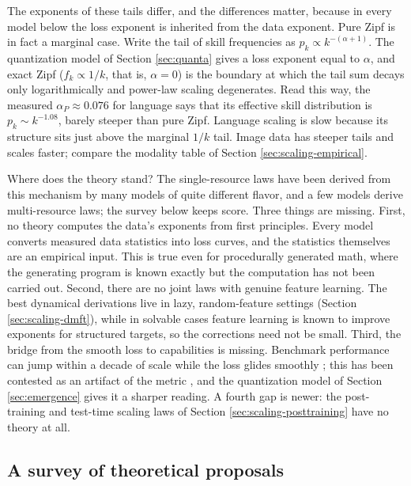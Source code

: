 \documentclass[11pt]{article}
\begin{document}
The exponents of these tails differ, and the differences matter, because in every model below the loss exponent is inherited from the data exponent. Pure Zipf is in fact a marginal case. Write the tail of skill frequencies as $p_k\propto k^{-(\alpha+1)}$. The quantization model of Section \ref{sec:quanta} gives a loss exponent equal to $\alpha$, and exact Zipf ($f_k\propto 1/k$, that is, $\alpha = 0$) is the boundary at which the tail sum decays only logarithmically and power-law scaling degenerates. Read this way, the measured $\alpha_P\approx 0.076$ for language says that its effective skill distribution is $p_k\sim k^{-1.08}$, barely steeper than pure Zipf. Language scaling is slow because its structure sits just above the marginal $1/k$ tail. Image data has steeper tails and scales faster; compare the modality table of Section \ref{sec:scaling-empirical}.

Where does the theory stand? The single-resource laws have been derived from this mechanism by many models of quite different flavor, and a few models derive multi-resource laws; the survey below keeps score. Three things are missing. First, no theory computes the data's exponents from first principles. Every model converts measured data statistics into loss curves, and the statistics themselves are an empirical input. This is true even for procedurally generated math, where the generating program is known exactly but the computation has not been carried out. Second, there are no joint laws with genuine feature learning. The best dynamical derivations live in lazy, random-feature settings (Section \ref{sec:scaling-dmft}), while in solvable cases feature learning is known to improve exponents for structured targets, so the corrections need not be small. Third, the bridge from the smooth loss to capabilities is missing. Benchmark performance can jump within a decade of scale while the loss glides smoothly \cite{wei2022emergent}; this has been contested as an artifact of the metric \cite{schaeffer2023emergent}, and the quantization model of Section \ref{sec:emergence} gives it a sharper reading. A fourth gap is newer: the post-training and test-time scaling laws of Section \ref{sec:scaling-posttraining} have no theory at all.

\subsection{A survey of theoretical proposals}
\label{sec:scaling-survey}
\end{document}

